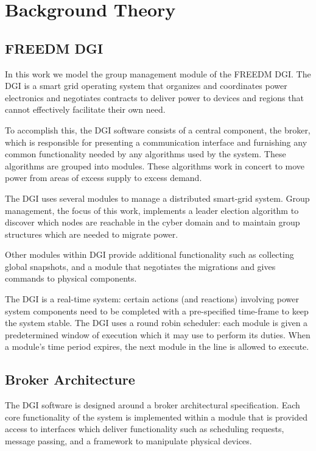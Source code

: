 \chapter{Background Theory}

\section{FREEDM DGI}

In this work we model the group management module of the FREEDM DGI. The DGI is a smart grid operating system that organizes and coordinates power electronics and negotiates contracts to deliver power to devices and regions that cannot effectively facilitate their own need.

To accomplish this, the DGI software consists of a central component, the broker, which is responsible for presenting a communication interface and furnishing any common functionality needed by any algorithms used by the system. These algorithms are grouped into modules. These algorithms work in concert to move power from areas of excess supply to excess demand.

The DGI uses several modules to manage a distributed smart-grid system. Group management, the focus of this work, implements a leader election algorithm to discover which nodes are reachable in the cyber domain and to maintain group structures which are needed to migrate power.

Other modules within DGI provide additional functionality such as collecting global snapshots, and a module that negotiates the migrations and gives commands to physical components.

The DGI is a real-time system: certain actions (and reactions) involving power system components need to be completed with a pre-specified time-frame to keep the system stable. The DGI uses a round robin scheduler: each module is given a predetermined window of execution which it may use to perform its duties. When a module's time period expires, the next module in the line is allowed to execute.

\section{Broker Architecture}

The DGI software is designed around a broker architectural specification. Each core functionality of the system is implemented within a module that is provided access to interfaces which deliver functionality such as scheduling requests, message passing, and a framework to manipulate physical devices.

